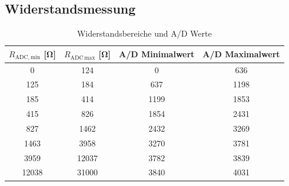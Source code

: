 \subsection{Widerstandsmessung}
\begin{table}[htb]
    \centering
    \caption{Widerstandsbereiche und A/D Werte}
    \label{tab: Widerstandsbereiche}
    \begin{tabular}{cccc}
        \toprule
        $R_{\text{ADC,}\,\text{min}}$ [\si{\ohm}]& $R_{\text{ADC}\, \text{max}}$  [\si{\ohm}] & A/D Minimalwert & A/D Maximalwert\\
        \midrule
        \num{0} & \num{124} & \num{0} & \num{636}\\
        \num{125} & \num{184} & \num{637} & \num{1198}\\
        \num{185} & \num{414} & \num{1199} & \num{1853}\\
		\num{415} & \num{826} & \num{1854} & \num{2431}\\
		\num{827} & \num{1462} & \num{2432} & \num{3269}\\
		\num{1463} & \num{3958} & \num{3270} & \num{3781}\\
		\num{3959} & \num{12037} & \num{3782} & \num{3839}\\
		\num{12038} & \num{31000} & \num{3840} & \num{4031}\\
        \bottomrule
    \end{tabular}
\end{table}



